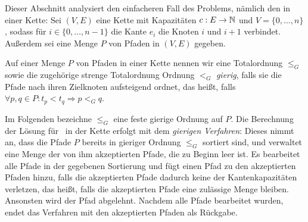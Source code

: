 Dieser Abschnitt analysiert den einfacheren Fall des Problems, nämlich den in einer Kette:
Sei $(V,E)$ eine Kette mit Kapazitäten $c: E \to \mathbb N$ und $V=\{0,\dots,n\}$, sodass für $i \in \{0,\dots,n-1\}$
die Kante $e_i$ die Knoten $i$ und $i+1$ verbindet.
Außerdem sei eine Menge $P$ von Pfaden in $(V,E)$ gegeben.
\begin{definition}
    Auf einer Menge $P$ von Pfaden in einer Kette nennen wir eine Totalordnung $\leq_G$ sowie die zugehörige strenge Totalordnung
    Ordnung $<_G$ {\em gierig},
    falls sie die Pfade nach ihren Zielknoten aufsteigend ordnet, das heißt, falls
    $\forall p, q \in P \colon t_p < t_q \Rightarrow p <_G q$.
\end{definition}
Im Folgenden bezeichne $\leq_G$ eine feste gierige Ordnung auf $P$.
Die Berechnung der Lösung für \CallControl\ in der Kette erfolgt mit dem {\em gierigen Verfahren}:
Dieses nimmt an, dass die Pfade $P$ bereits in gieriger Ordnung $\leq_G$ sortiert sind,
und verwaltet eine Menge der von ihm akzeptierten Pfade, die zu Beginn leer ist.
Es bearbeitet alle Pfade in der gegebenen Sortierung und fügt einen Pfad zu den akzeptierten Pfaden hinzu, falls die
akzeptierten Pfade dadurch keine der Kantenkapazitäten verletzen, das heißt, falls die akzeptierten Pfade eine zulässige Menge bleiben.
Ansonsten wird der Pfad abgelehnt.
Nachdem alle Pfade bearbeitet wurden, endet das Verfahren mit den akzeptierten Pfaden als Rückgabe.

